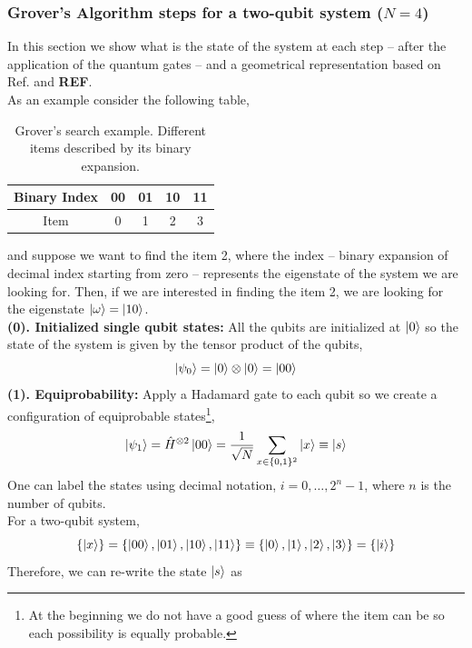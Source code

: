 \subsubsection{Grover's Algorithm steps for a two-qubit system ($N=4$)}
In this section we show what is the state of the system at each step -- after the application of the quantum gates -- and a geometrical representation based on Ref. \cite{Lavor2008Search} and \textbf{REF}.\\
As an example consider the following table,
\begin{table}[h]
\label{tab:GroverSearch}
\centering
\begin{tabular}{ c | c | c | c | c }
  \hline			
  Binary Index & 00 & 01 & 10 & 11 \\
    \hline		
  Item & 0 & 1 & 2 & 3 \\
  \hline  
\end{tabular}
\caption{Grover's search example. Different items described by its binary expansion.}
\end{table}
and suppose we want to find the item 2, where the index -- binary expansion of decimal index starting from zero -- represents the eigenstate of the system we are looking for. Then, if we are interested in finding the item 2, we are looking for the eigenstate $\ket{\omega} = \ket{10}$.\\
\textbf{(0). Initialized single qubit states:} All the qubits are initialized at $\ket{0}$ so the state of the system is given by the tensor product of the qubits,
\begin{equation}
    \ket{\psi_{0}} = \ket{0}\otimes \ket{0} = \ket{00}
\end{equation}
\textbf{(1). Equiprobability:} Apply a Hadamard gate to each qubit so we create a configuration of equiprobable states\footnote{At the beginning we do not have a good guess of where the item can be so each possibility is equally probable.},
\begin{equation}
    \ket{\psi_{1}} = \hat{H}^{\otimes 2}\ket{00} = \frac{1}{\sqrt{N}}\sum_{x \in \{0,1\}^{2}}\ket{x} \equiv \ket{s}
\end{equation}
 One can label the states using decimal notation, $i = 0 ,\ldots, 2^{n} -1$, where $n$ is the number of qubits.\\
For a two-qubit system,
\begin{equation}
   \{\ket{x}\} = \{\ket{00},\ket{01},\ket{10},\ket{11}\} \equiv \{\ket{0},\ket{1},\ket{2},\ket{3}\} = \{\ket{i}\}
\end{equation}
Therefore, we can re-write the state $\ket{s}$ as
